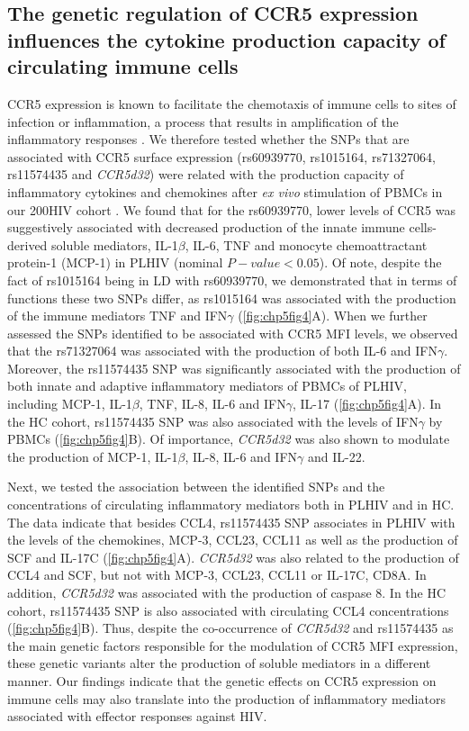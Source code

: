 \documentclass{book}
\begin{document}
\begin{refsection}
\subsection*{The genetic regulation of CCR5 expression influences the cytokine production capacity of circulating immune cells}
CCR5 expression is known to facilitate the chemotaxis of immune cells to sites of infection or inflammation, a process that results in amplification of the inflammatory responses \cite{Martin2016CCR5}.
We therefore tested whether the SNPs that are associated with CCR5 surface expression (rs60939770, rs1015164, rs71327064, rs11574435 and \textit{CCR5d32}) were related with the production capacity of inflammatory cytokines and chemokines after \textit{ex vivo} stimulation of PBMCs in our 200HIV cohort \cite{Van2021The}.
We found that for the rs60939770, lower levels of CCR5 was suggestively associated with decreased production of the innate immune cells-derived soluble mediators, IL-1$\beta$, IL-6, TNF and monocyte chemoattractant protein-1 (MCP-1) in PLHIV (nominal $P-value < 0.05$).
Of note, despite the fact of rs1015164 being in LD with rs60939770, we demonstrated that in terms of functions these two SNPs differ, as rs1015164 was associated with the production of the immune mediators TNF and IFN$\gamma$ (\ref{fig:chp5fig4}A).
When we further assessed the SNPs identified to be associated with CCR5 MFI levels, we observed that the rs71327064 was associated with the production of both IL-6 and IFN$\gamma$.
Moreover, the rs11574435 SNP was significantly associated with the production of both innate and adaptive inflammatory mediators of PBMCs of PLHIV, including MCP-1, IL-1$\beta$, TNF, IL-8, IL-6 and IFN$\gamma$, IL-17 (\ref{fig:chp5fig4}A).
In the HC cohort, rs11574435 SNP was also associated with the levels of IFN$\gamma$ by PBMCs (\ref{fig:chp5fig4}B).
Of importance, \textit{CCR5d32} was also shown to modulate the production of MCP-1, IL-1$\beta$, IL-8, IL-6 and IFN$\gamma$ and IL-22.  

Next, we tested the association between the identified SNPs and the concentrations of circulating inflammatory mediators both in PLHIV and in HC.
The data indicate that besides CCL4, rs11574435 SNP associates in PLHIV with the levels of the chemokines, MCP-3, CCL23, CCL11 as well as the production of SCF and IL-17C (\ref{fig:chp5fig4}A).
\textit{CCR5d32} was also related to the production of CCL4 and SCF, but not with MCP-3, CCL23, CCL11 or IL-17C, CD8A.
In addition, \textit{CCR5d32} was associated with the production of caspase 8.
In the HC cohort, rs11574435 SNP is also associated with circulating CCL4 concentrations (\ref{fig:chp5fig4}B).
Thus, despite the co-occurrence of \textit{CCR5d32} and rs11574435 as the main genetic factors responsible for the modulation of CCR5 MFI expression, these genetic variants alter the production of soluble mediators in a different manner.
Our findings indicate that the genetic effects on CCR5 expression on immune cells may also translate into the production of inflammatory mediators associated with effector responses against HIV.


\end{refsection}
\end{document}
